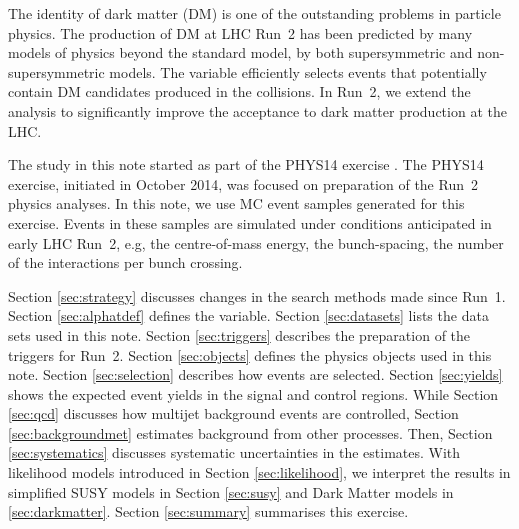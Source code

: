 The identity of dark matter (DM) is one of the outstanding problems in
particle physics. The production of DM at LHC Run~2 has been predicted
by many models of physics beyond the standard model, by both
supersymmetric and non-supersymmetric models. The \alphat variable
efficiently selects events that potentially contain DM candidates
produced in the collisions. In Run~2, we extend the \alphat analysis
to significantly improve the acceptance to dark matter production at
the LHC.

The study in this note started as part of the PHYS14 exercise
\cite{PHYS14}. The PHYS14 exercise, initiated in October 2014, was
focused on preparation of the Run~2 physics analyses. In this note, we
use MC event samples generated for this exercise. Events in these
samples are simulated under conditions anticipated in early LHC Run~2,
e.g, the centre-of-mass energy, the bunch-spacing, the number of the
interactions per bunch crossing.

Section \ref{sec:strategy} discusses changes in the search methods
made since Run~1. Section \ref{sec:alphatdef} defines the \alphat
variable.  Section \ref{sec:datasets} lists the data sets used in this
note.  Section \ref{sec:triggers} describes the preparation of the
triggers for Run~2. Section \ref{sec:objects} defines the physics
objects used in this note. Section \ref{sec:selection} describes how
events are selected. Section \ref{sec:yields} shows the expected event
yields in the signal and control regions. While Section \ref{sec:qcd}
discusses how multijet background events are controlled, Section
\ref{sec:backgroundmet} estimates background from other
processes. Then, Section \ref{sec:systematics} discusses systematic
uncertainties in the estimates. With likelihood models introduced in
Section \ref{sec:likelihood}, we interpret the results in simplified
SUSY models in Section \ref{sec:susy} and Dark Matter models in
\ref{sec:darkmatter}. Section \ref{sec:summary} summarises this
exercise.

